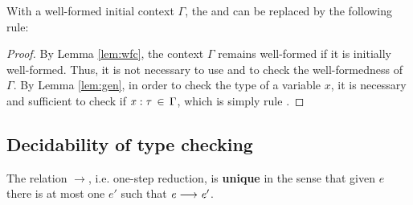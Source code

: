 \begin{lem}\label{lem:wfcopt}
	With a well-formed initial context $\Gamma$, the  and  can be replaced by the following rule: \ottusedrule{\ottdruleTSXXVar{}}
\end{lem}

\begin{proof}
	By Lemma \ref{lem:wfc}, the context $\Gamma$ remains well-formed if it is initially well-formed. Thus, it is not necessary to use  and  to check the well-formedness of $\Gamma$. By Lemma \ref{lem:gen}, in order to check the type of a variable $x$, it is necessary and sufficient to check if $\mathit{x}  :  \tau \, \in \, \Gamma$, which is simply rule .
\end{proof}

\subsection{Decidability of type checking}
\begin{lem}\label{lem:unired}
	The relation $ \longrightarrow $, i.e. one-step reduction, is \textbf{unique} in the sense that given $e$ there is at most one $e'$ such that $\mathit{e}  \longrightarrow  \mathit{e'}$.
\end{lem}

